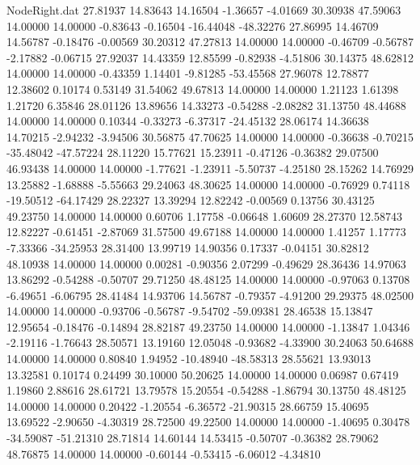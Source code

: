 \begin{filecontents}{NodeRight.dat}
  27.81937   14.83643   14.16504    -1.36657   -4.01669   30.30938   47.59063   14.00000   14.00000   -0.83643   -0.16504  -16.44048  -48.32276
  27.86995   14.46709   14.56787    -0.18476   -0.00569   30.20312   47.27813   14.00000   14.00000   -0.46709   -0.56787   -2.17882   -0.06715
  27.92037   14.43359   12.85599    -0.82938   -4.51806   30.14375   48.62812   14.00000   14.00000   -0.43359    1.14401   -9.81285  -53.45568
  27.96078   12.78877   12.38602     0.10174    0.53149   31.54062   49.67813   14.00000   14.00000    1.21123    1.61398    1.21720    6.35846
  28.01126   13.89656   14.33273    -0.54288   -2.08282   31.13750   48.44688   14.00000   14.00000    0.10344   -0.33273   -6.37317  -24.45132
  28.06174   14.36638   14.70215    -2.94232   -3.94506   30.56875   47.70625   14.00000   14.00000   -0.36638   -0.70215  -35.48042  -47.57224
  28.11220   15.77621   15.23911    -0.47126   -0.36382   29.07500   46.93438   14.00000   14.00000   -1.77621   -1.23911   -5.50737   -4.25180
  28.15262   14.76929   13.25882    -1.68888   -5.55663   29.24063   48.30625   14.00000   14.00000   -0.76929    0.74118  -19.50512  -64.17429
  28.22327   13.39294   12.82242    -0.00569    0.13756   30.43125   49.23750   14.00000   14.00000    0.60706    1.17758   -0.06648    1.60609
  28.27370   12.58743   12.82227    -0.61451   -2.87069   31.57500   49.67188   14.00000   14.00000    1.41257    1.17773   -7.33366  -34.25953
  28.31400   13.99719   14.90356     0.17337   -0.04151   30.82812   48.10938   14.00000   14.00000    0.00281   -0.90356    2.07299   -0.49629
  28.36436   14.97063   13.86292    -0.54288   -0.50707   29.71250   48.48125   14.00000   14.00000   -0.97063    0.13708   -6.49651   -6.06795
  28.41484   14.93706   14.56787    -0.79357   -4.91200   29.29375   48.02500   14.00000   14.00000   -0.93706   -0.56787   -9.54702  -59.09381
  28.46538   15.13847   12.95654    -0.18476   -0.14894   28.82187   49.23750   14.00000   14.00000   -1.13847    1.04346   -2.19116   -1.76643
  28.50571   13.19160   12.05048    -0.93682   -4.33900   30.24063   50.64688   14.00000   14.00000    0.80840    1.94952  -10.48940  -48.58313
  28.55621   13.93013   13.32581     0.10174    0.24499   30.10000   50.20625   14.00000   14.00000    0.06987    0.67419    1.19860    2.88616
  28.61721   13.79578   15.20554    -0.54288   -1.86794   30.13750   48.48125   14.00000   14.00000    0.20422   -1.20554   -6.36572  -21.90315
  28.66759   15.40695   13.69522    -2.90650   -4.30319   28.72500   49.22500   14.00000   14.00000   -1.40695    0.30478  -34.59087  -51.21310
  28.71814   14.60144   14.53415    -0.50707   -0.36382   28.79062   48.76875   14.00000   14.00000   -0.60144   -0.53415   -6.06012   -4.34810

\end{filecontents}

